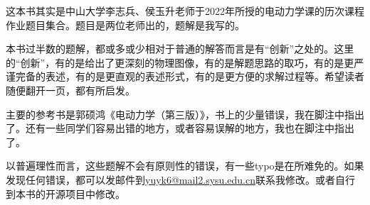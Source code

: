\thispagestyle{plain}
\vspace*{\fill}
    \begin{center}
        \begin{minipage}{0.75\textwidth}
            \begin{spacing}{2.0}
            
                \suojin
                这本书其实是中山大学李志兵、侯玉升老师于2022年所授的电动力学课的历次课程作业题目集合。题目是两位老师出的，题解是我写的。
                
                \suojin
                本书过半数的题解，都或多或少相对于普通的解答而言是有“创新”之处的。这里的“创新”，有的是给出了更深刻的物理图像，有的是解题思路的取巧，有的是更严谨完备的表述，有的是更直观的表述形式，有的是更方便的求解过程等。希望读者随便翻开一页，都有所启发。
                
                \suojin
                主要的参考书是郭硕鸿《电动力学（第三版）》，书上的少量错误，我在脚注中指出了。还有一些同学们容易出错的地方，或者容易误解的地方，我也在脚注中指出了。
                
                \suojin
                以普遍理性而言，这些题解不会有原则性的错误，有一些typo是在所难免的。如果发现任何错误，都可以发邮件到\url{yuyk6@mail2.sysu.edu.cn}联系我修改。或者自行到本书的开源项目中修改。
        
            \end{spacing}
        \end{minipage}
    \end{center}
\vspace*{\fill}

